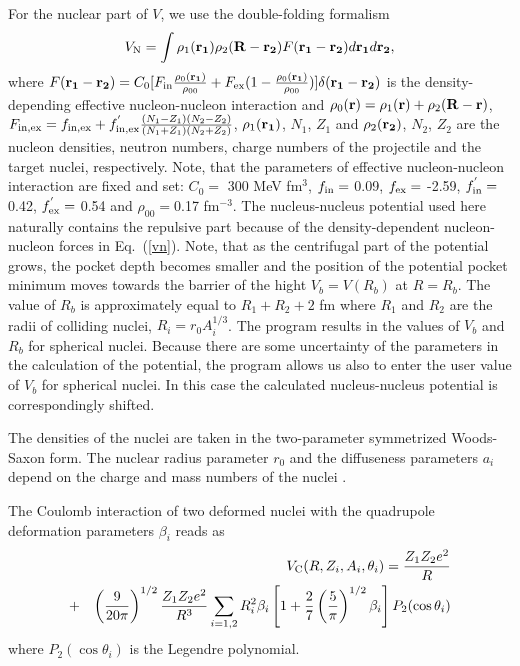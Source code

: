 \documentclass[preprint,review,12pt]{elsarticle}
\begin{document}
  For the nuclear part of $V$, we use the double-folding formalism
  \begin{eqnarray}
  V_{\rm N}=\int\rho_1(\bold {r_1})\rho_2(\bold{R}-\bold{r_2})F(\bold{r_1}-\bold{r_2})d\bold{r_1}d\bold{r_2},
  \label{vn}
  \end{eqnarray}
  where
  $F(\bold {r_1}-\bold{r_2})=C_0[F_{\rm in}\frac{\rho_0(\bold{r_1})}{\rho_{00}}+F_{\rm
  ex}(1-\frac{\rho_0(\bold{r_1})}{\rho_{00}})]\delta(\bold{r_1}-\bold{r_2})$
  is the density-depending effective nucleon-nucleon interaction and $\rho_0(\bold{r})=\rho_1(\bold{r})+\rho_2(\bold{R}-\bold{r})$,
  $F_{\rm in,ex}=f_{\rm in,ex}+f_{\rm in,ex}^{'}\frac{(N_1-Z_1)(N_2-Z_2)}{(N_1+Z_1)(N_2+Z_2)}$,
  $\rho_1(\bold{r_1})$, $N_1$, $Z_1$ and $\rho_2(\bold{r_2})$, $N_2$, $Z_2$ are the nucleon
  densities, neutron numbers, charge numbers of the projectile and the target
  nuclei, respectively.
  Note, that the parameters of effective nucleon-nucleon interaction are fixed and set:
  $C_0=$ 300 MeV fm$^3$, $f_{\rm in}=$ 0.09, $f_{\rm ex}=$ -2.59, $f_{\rm in}^{'}=$ 0.42, $f_{\rm ex}^{'}=$ 0.54 and $\rho_{00}=$0.17 fm$^{-3}$.
  The nucleus-nucleus potential \cite{poten} used here naturally contains the repulsive part because of the
  density-dependent nucleon-nucleon forces in Eq.~(\ref{vn}). Note, that as the centrifugal part of the potential grows, the pocket depth becomes smaller and the position of the potential pocket minimum moves towards the barrier
  of the hight $V_b=V(R_b)$ at $R=R_b$.
  The value of $R_b$ is approximately equal to $R_1+R_2+2$ fm where $R_1$ and $R_2$ are the radii of colliding nuclei,
  $R_i=r_0A_i^{1/3}$. The program results in the values of $V_b$ and $R_b$ for spherical
  nuclei. Because there are some uncertainty of the parameters
  in the calculation of the potential, the program allows us also to enter the user value of $V_b$ for spherical
  nuclei. In this case the calculated nucleus-nucleus potential is correspondingly shifted.

  The densities of the nuclei are taken in the two-parameter symmetrized Woods-Saxon form.
  The nuclear radius parameter $r_0$ and the diffuseness parameters $a_i$ depend on the charge and mass
  numbers of the nuclei \cite{poten}.

  The Coulomb interaction of two deformed nuclei with the quadrupole deformation parameters $\beta_i$
  reads as
  \begin{eqnarray}
  &&V_{\rm C}(R,Z_i, A_i,\theta_i)=\frac{Z_1 Z_2 e^2}{R}  \nonumber\\
  &+&
  \left(\frac{9}{20 \pi}\right)^{1/2}\frac{Z_1 Z_2 e^2}{R^3}\sum_{i=1,2}R_i^2\beta_i\left[1+\frac{2}{7} \left(\frac{5}{\pi}\right)^{1/2} \beta_i\right] P_2(\cos\theta_i)
  \end{eqnarray}
  where $P_2(\cos\theta_i)$ is the Legendre polynomial.
\end{document}
